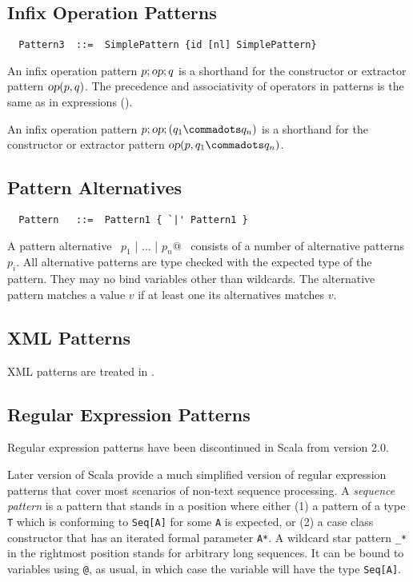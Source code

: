 \subsection{Infix Operation Patterns}

\syntax\begin{lstlisting}
  Pattern3  ::=  SimplePattern {id [nl] SimplePattern}
\end{lstlisting}

An infix operation pattern $p;\mbox{\sl op};q$ is a shorthand for the
constructor or extractor pattern $\mbox{\sl op}(p, q)$.  The precedence and
associativity of operators in patterns is the same as in expressions
().

An infix operation pattern $p;\op;(q_1 \commadots q_n)$ is a
shorthand for the constructor or extractor pattern $\op(p, q_1
\commadots q_n)$.

\subsection{Pattern Alternatives}

\syntax\begin{lstlisting}
  Pattern   ::=  Pattern1 { `|' Pattern1 }
\end{lstlisting}

A pattern alternative ~\lstinline@$p_1$ | $\ldots$ | $p_n$@~
consists of a number of alternative patterns $p_i$. All alternative
patterns are type checked with the expected type of the pattern. They
may no bind variables other than wildcards. The alternative pattern 
matches a value $v$ if at least one its alternatives matches $v$.

\subsection{XML Patterns}

XML patterns are treated in .

\subsection{Regular Expression Patterns}\label{sec:reg-pats}

Regular expression patterns have been discontinued in Scala from version 2.0.

Later version of Scala provide a much simplified version of regular
expression patterns that cover most scenarios of non-text sequence
processing.  A {\em sequence pattern} is a pattern that stands in a
position where either (1) a pattern of a type \lstinline+T+ which is
conforming to
\lstinline+Seq[A]+ for some \lstinline+A+ is expected, or (2) a case
class constructor that has an iterated formal parameter
\lstinline+A*+.  A wildcard star pattern \lstinline+_*+ in the
rightmost position stands for arbitrary long sequences. It can be
bound to variables using \lstinline+@+, as usual, in which case the variable will have the
type \lstinline+Seq[A]+.

